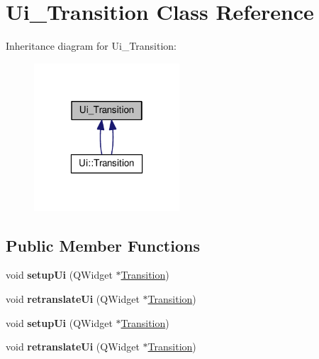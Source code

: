 \hypertarget{class_ui___transition}{\section{Ui\-\_\-\-Transition Class Reference}
\label{class_ui___transition}
}


Inheritance diagram for Ui\-\_\-\-Transition\-:
\nopagebreak
\begin{figure}[H]
\begin{center}
\leavevmode
\includegraphics[width=154pt]{class_ui___transition__inherit__graph}
\end{center}
\end{figure}
\subsection*{Public Member Functions}
\begin{DoxyCompactItemize}
\item 
\hypertarget{class_ui___transition_a06f0129cc1a15bc1c50b55447578b1c5}{void {\bfseries setup\-Ui} (Q\-Widget $\ast$\hyperlink{class_transition}{Transition})}\label{class_ui___transition_a06f0129cc1a15bc1c50b55447578b1c5}

\item 
\hypertarget{class_ui___transition_ad9e6b3650adf1487f6d51e7c5d340427}{void {\bfseries retranslate\-Ui} (Q\-Widget $\ast$\hyperlink{class_transition}{Transition})}\label{class_ui___transition_ad9e6b3650adf1487f6d51e7c5d340427}

\item 
\hypertarget{class_ui___transition_a06f0129cc1a15bc1c50b55447578b1c5}{void {\bfseries setup\-Ui} (Q\-Widget $\ast$\hyperlink{class_transition}{Transition})}\label{class_ui___transition_a06f0129cc1a15bc1c50b55447578b1c5}

\item 
\hypertarget{class_ui___transition_ad9e6b3650adf1487f6d51e7c5d340427}{void {\bfseries retranslate\-Ui} (Q\-Widget $\ast$\hyperlink{class_transition}{Transition})}\label{class_ui___transition_ad9e6b3650adf1487f6d51e7c5d340427}

\end{DoxyCompactItemize}
